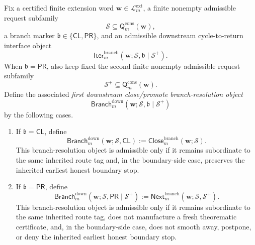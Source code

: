 \begin{definition}
\label{def:first-downstream-close-promote-branch-resolution-object}
Fix a certified finite extension word \(\mathbf w\in\mathcal L^{\mathrm{ext}}_{m}\), a finite nonempty admissible request subfamily
\[
  \mathcal S \subseteq \mathsf{Q}^{\mathrm{cons}}_{m}(\mathbf w),
\]
a branch marker \(\mathfrak b\in\{\mathsf{CL},\mathsf{PR}\}\), and an admissible downstream cycle-to-return interface object
\[
  \mathsf{Iter}^{\mathrm{branch}}_{m}(\mathbf w;\mathcal S,\mathfrak b\mid\mathcal S^{+}).
\]
When \(\mathfrak b=\mathsf{PR}\), also keep fixed the second finite nonempty admissible request subfamily
\[
  \mathcal S^{+}\subseteq \mathsf{Q}^{\mathrm{cons}}_{m}(\mathbf w).
\]
Define the associated \emph{first downstream close/promote branch-resolution object}
\[
  \mathsf{Branch}^{\mathrm{down}}_{m}(\mathbf w;\mathcal S,\mathfrak b\mid\mathcal S^{+})
\]
by the following cases.
\begin{enumerate}[label=(\roman*)]
  \item If \(\mathfrak b=\mathsf{CL}\), define
\[
  \mathsf{Branch}^{\mathrm{down}}_{m}(\mathbf w;\mathcal S,\mathsf{CL})
  :=
  \mathsf{Close}^{\mathrm{branch}}_{m}(\mathbf w;\mathcal S).
\]
This branch-resolution object is admissible only if it remains subordinate to the same inherited route tag and, in the boundary-side case, preserves the inherited earliest honest boundary stop.

  \item If \(\mathfrak b=\mathsf{PR}\), define
\[
  \mathsf{Branch}^{\mathrm{down}}_{m}(\mathbf w;\mathcal S,\mathsf{PR}\mid\mathcal S^{+})
  :=
  \mathsf{Next}^{\mathrm{branch}}_{m}(\mathbf w;\mathcal S,\mathcal S^{+}).
\]
This branch-resolution object is admissible only if it remains subordinate to the same inherited route tag, does not manufacture a fresh theorematic certificate, and, in the boundary-side case, does not smooth away, postpone, or deny the inherited earliest honest boundary stop.
\end{enumerate}
\end{definition}


